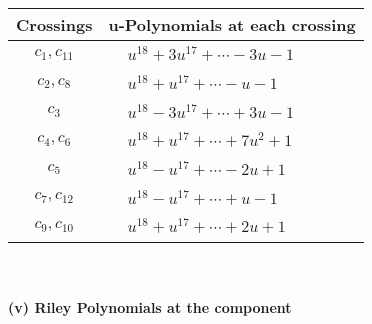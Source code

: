 \documentclass[1p]{elsarticle_modified}
\theoremstyle{definition}
\begin{document}
\begin{tabular}{m{50pt}|m{274pt}}
Crossings & \hspace{64pt}u-Polynomials at each crossing \\
\hline $$\begin{aligned}c_{1},c_{11}\end{aligned}$$&$\begin{aligned}
&u^{18}+3 u^{17}+\cdots-3 u-1
\end{aligned}$\\
\hline $$\begin{aligned}c_{2},c_{8}\end{aligned}$$&$\begin{aligned}
&u^{18}+u^{17}+\cdots- u-1
\end{aligned}$\\
\hline $$\begin{aligned}c_{3}\end{aligned}$$&$\begin{aligned}
&u^{18}-3 u^{17}+\cdots+3 u-1
\end{aligned}$\\
\hline $$\begin{aligned}c_{4},c_{6}\end{aligned}$$&$\begin{aligned}
&u^{18}+u^{17}+\cdots+7 u^2+1
\end{aligned}$\\
\hline $$\begin{aligned}c_{5}\end{aligned}$$&$\begin{aligned}
&u^{18}- u^{17}+\cdots-2 u+1
\end{aligned}$\\
\hline $$\begin{aligned}c_{7},c_{12}\end{aligned}$$&$\begin{aligned}
&u^{18}- u^{17}+\cdots+u-1
\end{aligned}$\\
\hline $$\begin{aligned}c_{9},c_{10}\end{aligned}$$&$\begin{aligned}
&u^{18}+u^{17}+\cdots+2 u+1
\end{aligned}$\\
\hline
\end{tabular}\\~\\
\newpage\renewcommand{\arraystretch}{1}
\flushleft \textbf{(v) Riley Polynomials at the component}\newline \\
\end{document}
